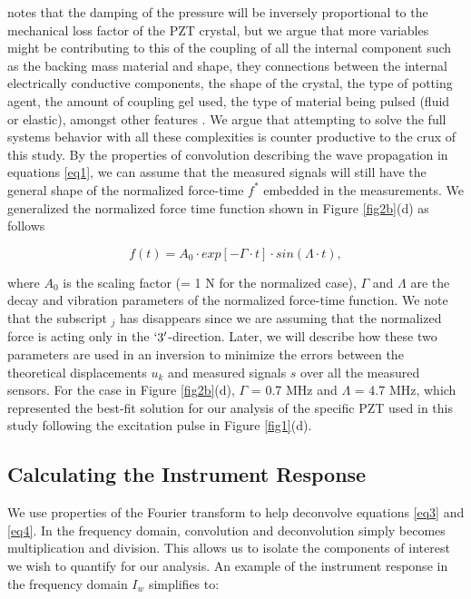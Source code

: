 \documentclass[preprint,3p, 11pt,authoryear]{elsarticle}
\begin{document}
{\citet{Christensen1988} notes that the damping of the pressure will be inversely proportional to the mechanical loss factor of the PZT crystal, but we argue that more variables might be contributing to this of the coupling of all the internal component such as the backing mass material and shape, they connections between the internal electrically conductive components, the shape of the crystal, the type of potting agent, the amount of coupling gel used, the type of material being pulsed (fluid or elastic), amongst other features \citep{Glaser1998}.  We argue that attempting to solve the full systems behavior with all these complexities is counter productive to the crux of this study. By the properties of convolution describing the wave propagation in equations \eqref{eq1}, we can assume that the measured signals will still have the general shape of the normalized force-time $f^{*}$ embedded in the measurements. We generalized the normalized force time function shown in Figure \ref{fig2b}(d) as follows

\begin{equation}
    \label{eq4b}
   f(t) = A_{0} \cdot exp[- \Gamma \cdot t]\cdot sin(\Lambda\cdot t) ,
\end{equation}

\noindent where $A_{0}$ is the scaling factor (= 1 N for the normalized case), $\Gamma$ and $\Lambda$ are the decay and vibration parameters of the normalized force-time function. We note that the subscript $_{j}$ has disappears since we are assuming that the normalized force is acting only in the $`3'$-direction. Later, we will describe how these two parameters are used in an inversion to minimize the errors between the theoretical displacements $u_{k}$ and measured signals $s$ over all the measured sensors. For the case in Figure \ref{fig2b}(d), $\Gamma$ = 0.7 MHz and $\Lambda$ = 4.7 MHz, which represented the best-fit solution for our analysis of the specific PZT used in this study following the excitation pulse in Figure \ref{fig1}(d).

\subsection{Calculating the Instrument Response}

We use properties of the Fourier transform \citep{Bracewell1986} to help deconvolve equations \eqref{eq3} and \eqref{eq4}.  In the frequency domain, convolution and deconvolution simply becomes multiplication and division. This allows us to isolate the components of interest we wish to quantify for our analysis. An example of the instrument response in the frequency domain $I_{w}$ simplifies to:

}
\end{document}
